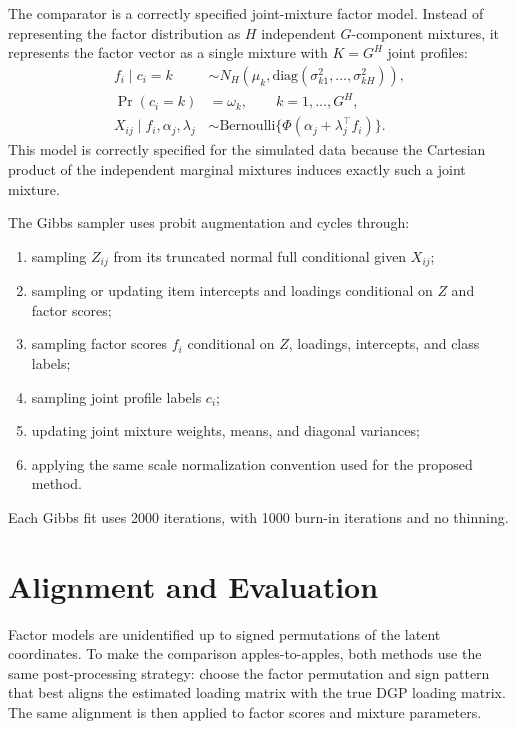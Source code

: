 \documentclass[11pt]{article}
\begin{document}
The comparator is a correctly specified joint-mixture factor model. Instead of representing the
factor distribution as $H$ independent $G$-component mixtures, it represents the factor vector as
a single mixture with $K=G^H$ joint profiles:
\begin{align}
f_i \mid c_i=k &\sim N_H(\mu_k,\mathrm{diag}(\sigma_{k1}^2,\ldots,\sigma_{kH}^2)), \\
\Pr(c_i=k) &= \omega_k, \qquad k=1,\ldots,G^H, \\
X_{ij} \mid f_i,\alpha_j,\lambda_j
  &\sim \mathrm{Bernoulli}\{\Phi(\alpha_j+\lambda_j^\top f_i)\}.
\end{align}
This model is correctly specified for the simulated data because the Cartesian product of the
independent marginal mixtures induces exactly such a joint mixture.

The Gibbs sampler uses probit augmentation and cycles through:
\begin{enumerate}[leftmargin=*]
  \item sampling $Z_{ij}$ from its truncated normal full conditional given $X_{ij}$;
  \item sampling or updating item intercepts and loadings conditional on $Z$ and factor scores;
  \item sampling factor scores $f_i$ conditional on $Z$, loadings, intercepts, and class labels;
  \item sampling joint profile labels $c_i$;
  \item updating joint mixture weights, means, and diagonal variances;
  \item applying the same scale normalization convention used for the proposed method.
\end{enumerate}
Each Gibbs fit uses 2000 iterations, with 1000 burn-in iterations and no thinning.

\section{Alignment and Evaluation}

Factor models are unidentified up to signed permutations of the latent coordinates. To make the
comparison apples-to-apples, both methods use the same post-processing strategy: choose the
factor permutation and sign pattern that best aligns the estimated loading matrix with the true
DGP loading matrix. The same alignment is then applied to factor scores and mixture parameters.
\end{document}
